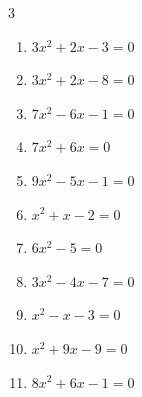 


\setcounter{quesnum}{21}

\begin{multicols}{3}
\begin{enumerate}
  \itemsep=55pt
  \item $3x^{2}+2x-3=0$


  \item $3x^{2}+2x-8=0$


  \item $7x^{2}-6x-1=0$


  \item $7x^{2}+6x=0$


  \item $9x^{2}-5x-1=0$


  \item $x^{2}+x-2=0$

        \phantom{$\displaystyle x=1, \; -2$}

  \item $6x^{2}-5=0$


\columnbreak %

  \item $3x^{2}-4x-7=0$


  \item $x^{2}-x-3=0$


  \item $x^{2}+9x-9=0$


  \item $8x^{2}+6x-1=0$



\end{enumerate}
\end{multicols}
